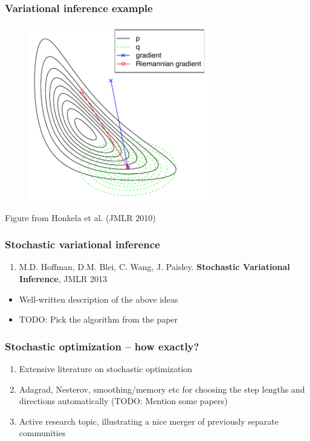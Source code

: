 \documentclass{beamer}
\begin{document}
\begin{frame}
  \frametitle{Variational inference example}

  \begin{figure}
  \begin{center}
  \includegraphics[width=0.7\textwidth]{VBnatgrad.pdf}
  \end{center}
  \end{figure}
  \vfill \hfill {\tiny Figure from Honkela et al. (JMLR 2010)}
\end{frame}

\begin{frame}
  \frametitle{Stochastic variational inference}

  \begin{enumerate}
  \item M.D. Hoffman, D.M. Blei, C. Wang, J. Paisley. \textbf{Stochastic Variational Inference}, JMLR 2013
  \end{enumerate}

  \begin{itemize}
    \item Well-written description of the above ideas
    \item TODO: Pick the algorithm from the paper
  \end{itemize}
\end{frame}

\begin{frame}
  \frametitle{Stochastic optimization -- how exactly?}

  \begin{enumerate}
    \item Extensive literature on stochastic optimization
    \item Adagrad, Nesterov, smoothing/memory etc for choosing the step lengths
      and directions automatically (TODO: Mention some papers)
    \item Active research topic, illustrating a nice merger of
      previously separate communities
  \end{enumerate}
\end{frame}
\end{document}
